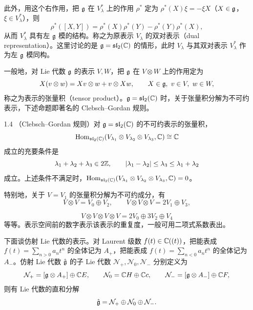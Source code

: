 
此外，用这个右作用，把 $\mathfrak{g}$ 在 $V_\lambda^*$ 上的作用 $\rho^*$ 定为 $\rho^*(X)\xi=-\xi X$（$X\in\mathfrak{g}$，$\xi\in V_\lambda^*$），则
\[
  \rho^*([X,Y])=\rho^*(X)\rho^*(Y)-\rho^*(Y)\rho^*(X),
\]
从而 $V_\lambda^*$ 具有左 $\mathfrak{g}$ 模的结构。称之为原表示 $V_\lambda$ 的双对表示（dual representation）。这里讨论的是 $\mathfrak{g}=\mathfrak{sl}_2(\mathbb{C})$ 的情形，此时 $V_\lambda$ 与其双对表示 $V_\lambda^*$ 作为左 $\mathfrak{g}$ 模同构。

一般地，对 Lie 代数 $\mathfrak{g}$ 的表示 $V,W$，把 $\mathfrak{g}$ 在 $V\otimes W$ 上的作用定为
\[
  X(v\otimes w)=Xv\otimes w+v\otimes Xw,\qquad
  X\in\mathfrak{g},\ v\in V,\ w\in W,
\]
称之为表示的张量积（tensor product）。$\mathfrak{g}=\mathfrak{sl}_2(\mathbb{C})$ 时，关于张量积分解为不可约表示，下述命题即著名的 Clebsch--Gordan 规则。

\begin{proposition}{1.4}
（Clebsch--Gordan 规则）对 $\mathfrak{g}=\mathfrak{sl}_2(\mathbb{C})$ 的不可约表示的张量积，
\[
  \operatorname{Hom}_{\mathfrak{sl}_2(\mathbb{C})}(V_{\lambda_1}\otimes V_{\lambda_2}\otimes V_{\lambda_3},\mathbb{C})\cong\mathbb{C}
\]
成立的充要条件是
\[
  \lambda_1+\lambda_2+\lambda_3\in 2\mathbb{Z},\qquad
  |\lambda_1-\lambda_2|\le\lambda_3\le\lambda_1+\lambda_2
\]
成立。上述条件不满足时，$\operatorname{Hom}_{\mathfrak{sl}_2(\mathbb{C})}(V_{\lambda_1}\otimes V_{\lambda_2}\otimes V_{\lambda_3},\mathbb{C})=0$。
\end{proposition}

特别地，关于 $V=V_1$ 的张量积分解为不可约成分，有
\[
  V\otimes V=V_0\oplus V_2,\qquad
  V\otimes V\otimes V=2V_1\oplus V_3,
\]

\[
  V\otimes V\otimes V\otimes V=2V_0\oplus 3V_2\oplus V_4
\]
等等。表示空间前的数字表示该表示的重复度，一般可用二项式系数表出。


下面谈仿射 Lie 代数的表示。对 Laurent 级数 $f(t)\in\mathbb{C}((t))$，把能表成 $f(t)=\sum_{n>0}a_nt^n$ 的全体记为 $A_+$，把能表成 $f(t)=\sum_{n<0}a_nt^n$ 的全体记为 $A_-$。仿射 Lie 代数 $\hat{\mathfrak{g}}$ 的子 Lie 代数 $\mathcal{N}_+,\mathcal{N}_0,\mathcal{N}_-$ 分别定义为
\[
  \mathcal{N}_+=[\mathfrak{g}\otimes A_+]\oplus\mathbb{C} E,\qquad
  \mathcal{N}_0=\mathbb{C} H\oplus\mathbb{C} c,\qquad
  \mathcal{N}_-=[\mathfrak{g}\otimes A_-]\oplus\mathbb{C} F,
\]
则有 Lie 代数的直和分解
\[
  \hat{\mathfrak{g}}=\mathcal{N}_+\oplus\mathcal{N}_0\oplus\mathcal{N}_-.
\]

